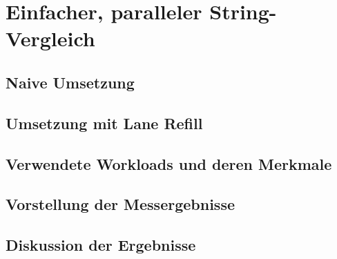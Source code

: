 \chapter{Einfacher, paralleler String-Vergleich}

\section{Naive Umsetzung}

\section{Umsetzung mit Lane Refill}

\section{Verwendete Workloads und deren Merkmale}

\section{Vorstellung der Messergebnisse}

\section{Diskussion der Ergebnisse}
